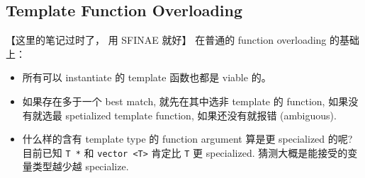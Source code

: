 \subsection{Template Function Overloading}
【这里的笔记过时了， 用 SFINAE 就好】
在普通的 function overloading 的基础上：
\begin{itemize}
\item 所有可以 instantiate 的 template 函数也都是 viable 的。
\item 如果存在多于一个 best match, 就先在其中选非 template 的 function, 如果没有就选最 spetialized template function, 如果还没有就报错 (ambiguous).
\item 什么样的含有 template type 的 function argument 算是更 specialized 的呢? 目前已知 \verb`T *` 和 \verb`vector <T>` 肯定比 \verb`T` 更 specialized. 猜测大概是能接受的变量类型越少越 specialize.
\end{itemize}

